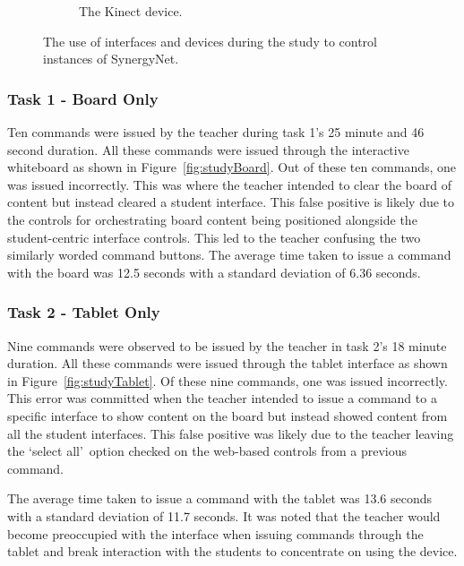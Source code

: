 \documentclass[link]{IWCOMP}
\begin{document}
\begin{figure}[t]
\begin{subfigure}[t]{0.3\textwidth}
		\caption{The Kinect device.}
		\label{fig:studyKinect}
	\end{subfigure}
   	\caption{The use of interfaces and devices during the study to control instances of SynergyNet.}
   	\label{fig:studyDevices}
\end{figure} 

\subsubsection{Task 1 - Board Only}
\label{subsubsec:studyPhase1ResultsTask1}

Ten commands were issued by the teacher during task 1's 25 minute and 46 second duration.
All these commands were issued through the interactive whiteboard as shown in Figure~\ref{fig:studyBoard}.
Out of these ten commands, one was issued incorrectly.
This was where the teacher intended to clear the board of content but instead cleared a student interface.
This false positive is likely due to the controls for orchestrating board content being positioned alongside the student-centric interface controls.
This led to the teacher confusing the two similarly worded command buttons.
The average time taken to issue a command with the board was 12.5 seconds with a standard deviation of 6.36 seconds.

\subsubsection{Task 2 - Tablet Only}
\label{subsubsec:studyPhase1ResultsTask2}

Nine commands were observed to be issued by the teacher in task 2's 18 minute duration.
All these commands were issued through the tablet interface as shown in Figure~\ref{fig:studyTablet}.
Of these nine commands, one was issued incorrectly.
This error was committed when the teacher intended to issue a command to a specific interface to show content on the board but instead showed content from all the student interfaces.
This false positive was likely due to the teacher leaving the \lq select all\rq\ option checked on the web-based controls from a previous command.

The average time taken to issue a command with the tablet was 13.6 seconds with a standard deviation of 11.7 seconds.
It was noted that the teacher would become preoccupied with the interface when issuing commands through the tablet and break interaction with the students to concentrate on using the device.
\end{document}
